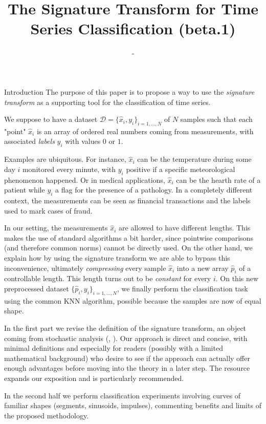 \documentclass[twocolumn,9pt]{article}
\title{The Signature Transform for Time Series Classification (beta.1)}
\author {-}
\theoremstyle{definition}
\theoremstyle{remark}
\begin{document}
\maketitle
\begin{section}{Introduction}
The purpose of this paper is to propose a way to use the 
\emph{signature transform} as a supporting tool for 
the classification of time series.


We suppose to have a dataset 
$\mathcal{D} = \{ \hat{x}_i, y_i \}_{i=1, \dots , N}$
of $N$ samples such that
each "point" $\hat{x}_i$ is
an array of ordered real numbers coming from measurements,
with associated \emph{labels} $y_i$ with values $0$ or $1$.

Examples are ubiquitous.
For instance, $\hat{x}_i$ can be the temperature during some day $i$
monitored every minute, with $y_i$ positive
if a specific meteorological
phenomenon happened. Or in medical applications, $\hat{x}_i$ can be
the hearth rate of a patient while $y_i$ a flag for the presence of a pathology.
In a completely different context,
the measurements can be seen as financial transactions
and the labels used to mark cases of fraud.


In our setting, the measurements $\hat{x}_i$
are allowed to have different lengths.
This makes the use of standard algorithms a bit harder,
since pointwise comparisons (and therefore common norms)
cannot be directly used.
On the other hand, we explain how by using the signature transform 
we are able to bypass this inconvenience, ultimately \emph{compressing}
every sample $\hat{x}_i$ into a new array $\hat{p}_i$
of a controllable length.
This length turns out to be \emph{constant} for every $i$.
On this new preprocessed 
dataset $\{ \hat{p}_i, y_i\}_{i = 1, \dots, N}$,
we finally perform the classification task using the common KNN algorithm,
possible because the samples are now of equal shape.


In the first part we revise the definition 
of the signature transform, 
an object coming from  stochastic analysis
(\cite{FrizVic}, \cite{LyonsBook}).
Our approach is direct and concise, with minimal definitions
and especially for readers (possibly with a limited mathematical background)
who desire to see if the approach can actually offer enough advantages
before moving into the theory in a later step.
The resource \cite{PRIMER} expands our exposition and 
is particularly recommended.

In the second half we perform classification experiments involving
curves of familiar shapes (segments, sinusoids, impulses), commenting
benefits and limits of the proposed methodology.
\end{section}
\end{document}
